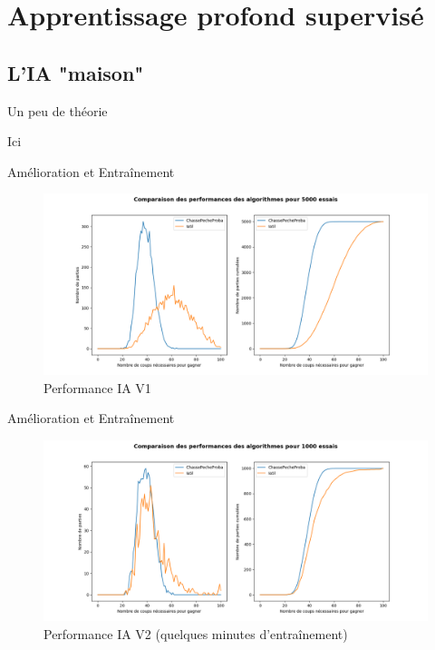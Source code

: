 \section{Apprentissage profond supervisé}

\subsection{L'IA "maison"}
	
	\begin{frame}{Un peu de théorie}
		\begin{block}{Ici}
	    \end{block}
	\end{frame}
	
	\begin{frame}{Amélioration et Entraînement}
	    \begin{figure}
	        \centering
	        \includegraphics[width=.95\linewidth]{images/perfiasl1.png}
	        \caption*{Performance IA V1}
	        \label{fig:perfiasl1}
	    \end{figure}{}
	\end{frame}{}
	
	\begin{frame}{Amélioration et Entraînement}
	    \begin{figure}
	        \centering
	        \includegraphics[width=.95\linewidth]{images/perfiasl2.png}
	        \caption*{Performance IA V2 (quelques minutes d'entraînement)}
	        \label{fig:perfiasl2}
	    \end{figure}{}
	\end{frame}{}
	
